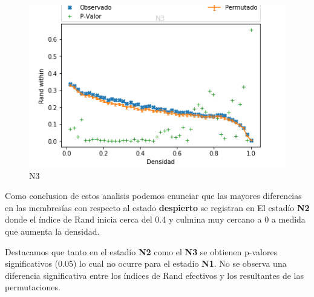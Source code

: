 \begin{figure}[H]
    \centering
    \includegraphics[width = 5in]{img/4_N3.png}
    \caption{N3}
    \label{fig:4_N3.png}
\end{figure}


Como conclusion de estos analisis podemos enunciar que las mayores diferencias en las membresías con respecto al estado \textbf{despierto} se registran en 
El estadío \textbf{N2} donde el índice de Rand inicia cerca del 0.4 y culmina muy cercano a 0 a medida que aumenta la densidad.

Destacamos que tanto en el estadío \textbf{N2} como el \textbf{N3}  se obtienen p-valores  significativos (0.05) lo cual no ocurre para el estadio \textbf{N1}.
No se observa una diferencia significativa entre los índices de Rand efectivos y los resultantes de las permutaciones.
